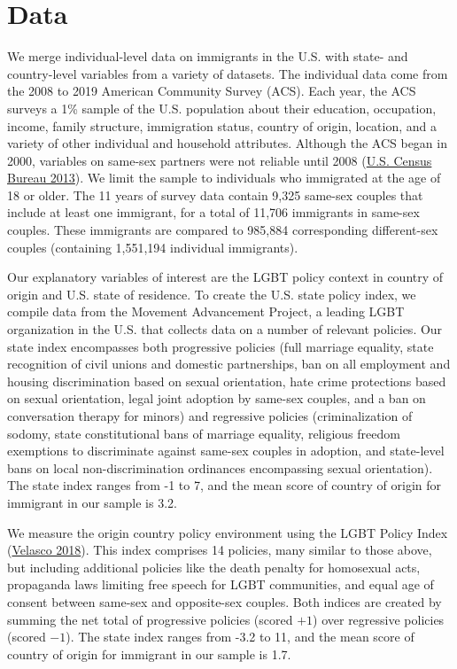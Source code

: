 \documentclass[
  11pt,
]{article}
\begin{document}
\hypertarget{data}{%
\section{Data}\label{data}}

We merge individual-level data on immigrants in the U.S. with state- and country-level variables from a variety of datasets. The individual data come from the 2008 to 2019 American Community Survey (ACS). Each year, the ACS surveys a 1\% sample of the U.S. population about their education, occupation, income, family structure, immigration status, country of origin, location, and a variety of other individual and household attributes. Although the ACS began in 2000, variables on same-sex partners were not reliable until 2008 (\protect\hyperlink{ref-u.s.censusbureau_2013}{U.S. Census Bureau 2013}). We limit the sample to individuals who immigrated at the age of 18 or older. The 11 years of survey data contain 9,325 same-sex couples that include at least one immigrant, for a total of 11,706 immigrants in same-sex couples. These immigrants are compared to 985,884 corresponding different-sex couples (containing 1,551,194 individual immigrants).

Our explanatory variables of interest are the LGBT policy context in country of origin and U.S. state of residence. To create the U.S. state policy index, we compile data from the Movement Advancement Project, a leading LGBT organization in the U.S. that collects data on a number of relevant policies. Our state index encompasses both progressive policies (full marriage equality, state recognition of civil unions and domestic partnerships, ban on all employment and housing discrimination based on sexual orientation, hate crime protections based on sexual orientation, legal joint adoption by same-sex couples, and a ban on conversation therapy for minors) and regressive policies (criminalization of sodomy, state constitutional bans of marriage equality, religious freedom exemptions to discriminate against same-sex couples in adoption, and state-level bans on local non-discrimination ordinances encompassing sexual orientation). The state index ranges from -1 to 7, and the mean score of country of origin for immigrant in our sample is 3.2.

We measure the origin country policy environment using the LGBT Policy Index (\protect\hyperlink{ref-velasco_2018}{Velasco 2018}). This index comprises 14 policies, many similar to those above, but including additional policies like the death penalty for homosexual acts, propaganda laws limiting free speech for LGBT communities, and equal age of consent between same-sex and opposite-sex couples. Both indices are created by summing the net total of progressive policies (scored \(+1\)) over regressive policies (scored \(-1\)). The state index ranges from -3.2 to 11, and the mean score of country of origin for immigrant in our sample is 1.7.
\end{document}

